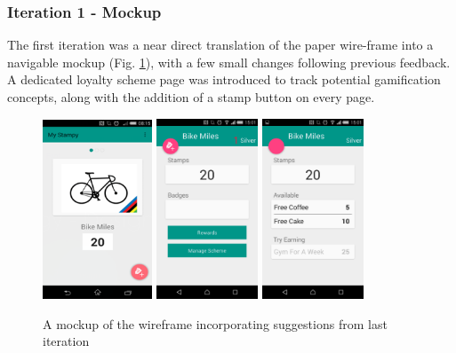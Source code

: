 \subsubsection{Iteration 1 - Mockup}
The first iteration was a near direct translation of the paper wire-frame into a navigable mockup (Fig. \ref{fig:wireframe2}), with a few small changes following previous feedback. A dedicated loyalty scheme page was introduced to track potential gamification concepts, along with the addition of a stamp button on every page.
\begin{figure}[H]
 \centering
  \includegraphics[width=0.29\textwidth]{img/MainMockup.png}
   \includegraphics[width=0.27\textwidth]{img/firstiteration1.png}
    \includegraphics[width=0.27\textwidth]{img/firstiteration2.png}
    \caption{A mockup of the wireframe incorporating suggestions from last iteration}
	\label{fig:wireframe2}
\end{figure}

